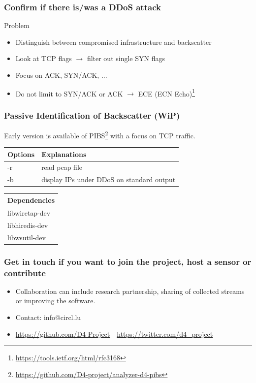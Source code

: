\documentclass{beamer}
\begin{document}
\begin{frame}
    \frametitle{Confirm if there is/was a DDoS attack}
    \begin{block}{Problem}
        \begin{itemize}
            \item Distinguish between compromised infrastructure and backscatter
            \item Look at TCP flags $\to$ filter out single SYN flags
            \item Focus on ACK, SYN/ACK, ...
            \item Do not limit to SYN/ACK or ACK $\to$ ECE (ECN Echo)\footnote{\url{https://tools.ietf.org/html/rfc3168}}
        \end{itemize}
    \end{block}
    
\end{frame}

\begin{frame}
        \frametitle{Passive Identification of Backscatter (WiP)}
        
        Early version is available of PIBS\footnote{\url{https://github.com/D4-project/analyzer-d4-pibs}}
        with a focus on TCP traffic.
\begin{tabular}{l|l}
Options & Explanations\\
\hline
-r & read pcap file\\
-b & display IPs under DDoS on standard output\\
\end{tabular}


\begin{tabular}{l}
	Dependencies\\
	\hline
	libwiretap-dev\\
	libhiredis-dev\\
	libwsutil-dev\\
\end{tabular}
\end{frame}

\begin{frame}
\frametitle{Get in touch if you want to join the project, host a sensor or contribute}
\begin{itemize}
\item Collaboration can include research partnership, sharing of collected streams or improving the software.
\item Contact: info@circl.lu
\item \url{https://github.com/D4-Project} -  \url{https://twitter.com/d4_project}
\end{itemize}
\end{frame}
\end{document}
